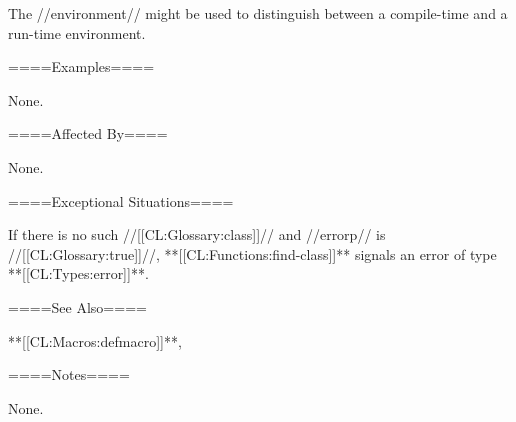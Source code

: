 The //environment// might be used to distinguish between a compile-time and a run-time environment.

====Examples====

None.

====Affected By====

None.

====Exceptional Situations====

If there is no such //[[CL:Glossary:class]]// and //errorp// is //[[CL:Glossary:true]]//, **[[CL:Functions:find-class]]** signals an error of type **[[CL:Types:error]]**.

====See Also====

**[[CL:Macros:defmacro]]**, {\secref\IntegratingTypesAndClasses}

====Notes====

None.

  
